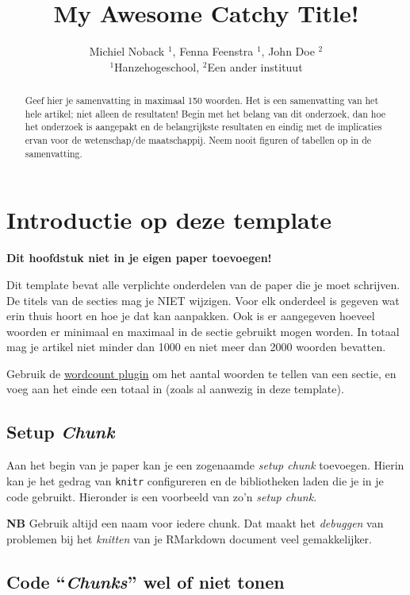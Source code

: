 \documentclass[
]{article}
\title{My Awesome Catchy Title!}
\author{Michiel Noback \(^1\), Fenna Feenstra \(^1\), John Doe \(^2\)\\
\(^1\)Hanzehogeschool, \(^2\)Een ander instituut}
\date{}
\begin{document}
\maketitle
\begin{abstract}
Geef hier je samenvatting in maximaal 150 woorden. Het is een samenvatting van het hele artikel; niet alleen de resultaten! Begin met het belang van dit onderzoek, dan hoe het onderzoek is aangepakt en de belangrijkste resultaten en eindig met de implicaties ervan voor de wetenschap/de maatschappij. Neem nooit figuren of tabellen op in de samenvatting.
\end{abstract}

\hypertarget{introductie-op-deze-template}{%
\section{Introductie op deze template}\label{introductie-op-deze-template}}

\textbf{Dit hoofdstuk niet in je eigen paper toevoegen!}

Dit template bevat alle verplichte onderdelen van de paper die je moet schrijven. De titels van de secties mag je NIET wijzigen. Voor elk onderdeel is gegeven wat erin thuis hoort en hoe je dat kan aanpakken. Ook is er aangegeven hoeveel woorden er minimaal en maximaal in de sectie gebruikt mogen worden. In totaal mag je artikel niet minder dan 1000 en niet meer dan 2000 woorden bevatten.

Gebruik de \href{https://github.com/benmarwick/wordcountaddin}{wordcount plugin} om het aantal woorden te tellen van een sectie, en voeg aan het einde een totaal in (zoals al aanwezig in deze template).

\hypertarget{setup-chunk}{%
\subsection{\texorpdfstring{Setup \emph{Chunk}}{Setup Chunk}}\label{setup-chunk}}

Aan het begin van je paper kan je een zogenaamde \emph{setup chunk} toevoegen. Hierin kan je het gedrag van \texttt{knitr} configureren en de bibliotheken laden die je in je code gebruikt. Hieronder is een voorbeeld van zo'n \emph{setup chunk}.

\textbf{NB} Gebruik altijd een naam voor iedere chunk. Dat maakt het \emph{debuggen} van problemen bij het \emph{knitten} van je RMarkdown document veel gemakkelijker.

\hypertarget{code-chunks-wel-of-niet-tonen}{%
\subsection{\texorpdfstring{Code ``\emph{Chunks}'' wel of niet tonen}{Code ``Chunks'' wel of niet tonen}}\label{code-chunks-wel-of-niet-tonen}}
\end{document}
